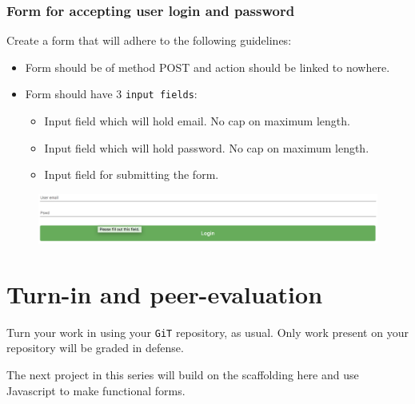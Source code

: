 \documentclass{42-en}
\begin{document}
        \subsection{Form for accepting user login and password}
        Create a form that will adhere to the following guidelines:
        \begin{itemize}\itemsep3pt
            \item Form should be of method POST and action should be linked to nowhere.
            \item Form should have 3 \texttt{input fields}:
            \begin{itemize}
                \item Input field which will hold email. No cap on maximum length.
                \item Input field which will hold password. No cap on maximum length.
                \item Input field for submitting the form.
            \end{itemize}
        \end{itemize}
        \begin{figure}[H]
            \begin{center}
                \includegraphics[width=15cm]{form2p2.png}
            \end{center}
        \end{figure}


\chapter{Turn-in and peer-evaluation}

    Turn your work in using your \texttt{GiT} repository, as
    usual. Only work present on your repository will be graded in defense.

    The next project in this series will build on the scaffolding here and use Javascript to make functional forms.


\end{document}
